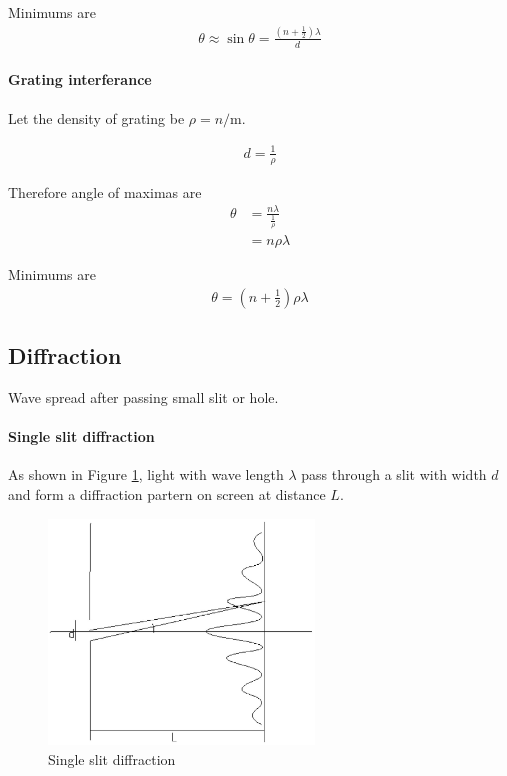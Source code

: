             Minimums are 
            \begin{align}
                \theta \approx \sin \theta = \frac{(n + \frac{1}{2}) \lambda}{d}
            \end{align}

        \paragraph{Grating interferance}
            Let the density of grating be $\rho = n / \mathrm{m}$.

            \begin{align}
                d = \frac{1}{\rho}
            \end{align}

            Therefore angle of maximas are
            \begin{align}
                \theta &= \frac{n \lambda}{\frac{1}{\rho}} \\
                       &= n \rho \lambda
            \end{align}

            Minimums are
            \begin{align}
                \theta = (n + \frac{1}{2}) \rho \lambda
            \end{align}

    \subsection{Diffraction}
        Wave spread after passing small slit or hole.

        \paragraph{Single slit diffraction}
            As shown in Figure \ref{sin_slit}, light with wave length $\lambda$ pass through a slit with width $d$ and form a diffraction partern on screen at distance $L$.

            \begin{figure}[H]
                \begin{center}
                    \includegraphics[height=6cm]{wave_charts/sing_slit.eps}
                \end{center}
                \caption{Single slit diffraction}
                \label{sin_slit}
            \end{figure}

